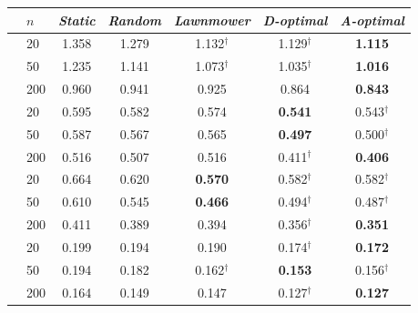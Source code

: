 \begin{tabular}{ll ccccc}
\toprule
 & $n$ & \emph{Static} & \emph{Random} & \emph{Lawnmower} & \emph{D-optimal} & \emph{A-optimal} \\
\midrule
{}
 & 20  & 1.358 & 1.279 & 1.132$^\dagger$ & 1.129$^\dagger$ & \textbf{1.115} \\
 & 50  & 1.235 & 1.141 & 1.073$^\dagger$ & 1.035$^\dagger$ & \textbf{1.016} \\
 & 200  & 0.960 & 0.941 & 0.925 & 0.864 & \textbf{0.843} \\
\midrule
{}
 & 20  & 0.595 & 0.582 & 0.574 & \textbf{0.541} & 0.543$^\dagger$ \\
 & 50  & 0.587 & 0.567 & 0.565 & \textbf{0.497} & 0.500$^\dagger$ \\
 & 200  & 0.516 & 0.507 & 0.516 & 0.411$^\dagger$ & \textbf{0.406} \\
\midrule
{}
 & 20  & 0.664 & 0.620 & \textbf{0.570} & 0.582$^\dagger$ & 0.582$^\dagger$ \\
 & 50  & 0.610 & 0.545 & \textbf{0.466} & 0.494$^\dagger$ & 0.487$^\dagger$ \\
 & 200  & 0.411 & 0.389 & 0.394 & 0.356$^\dagger$ & \textbf{0.351} \\
\midrule
{}
 & 20  & 0.199 & 0.194 & 0.190 & 0.174$^\dagger$ & \textbf{0.172} \\
 & 50  & 0.194 & 0.182 & 0.162$^\dagger$ & \textbf{0.153} & 0.156$^\dagger$ \\
 & 200  & 0.164 & 0.149 & 0.147 & 0.127$^\dagger$ & \textbf{0.127} \\
\bottomrule
\end{tabular}
